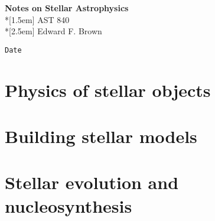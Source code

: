 \documentclass[11pt]{book}
\begin{document}
\newcommand{\thetitle}{Notes on Stellar Astrophysics}
\newcommand{\thecourse}{AST 840}
\newcommand{\theauthor}{Edward F. Brown}

\begin{titlepage}
\begin{center}
\LARGE{\textbf{\thetitle}}\\*[1.5em]
\Large{\thecourse}\\*[2.5em]
\large{\theauthor}
\end{center}
\vfill
\small{\verb$Date$}
\end{titlepage}

\tableofcontents

\part{Physics of stellar objects}





\part{Building stellar models}



\part{Stellar evolution and nucleosynthesis}







\appendix





\end{document}
